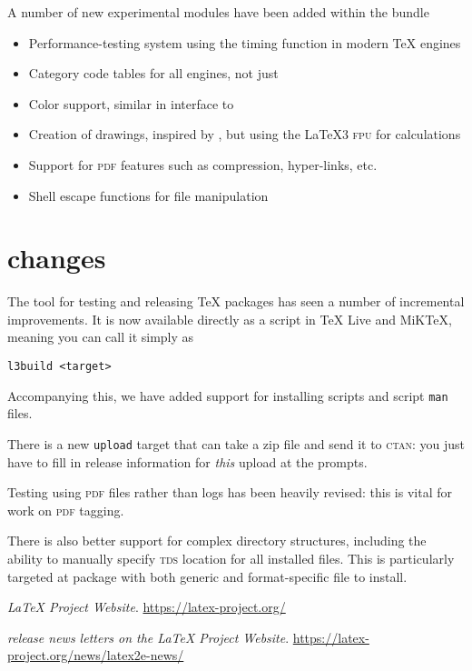 \documentclass{ltnews}
\begin{document}
A number of new experimental modules have been added within the
 bundle
\begin{itemize}
  \item {} Performance-testing system using the timing
    function in modern \TeX{} engines
  \item {} Category code tables for all engines, not
    just 
  \item {} Color support, similar in interface to 
  \item {} Creation of drawings, inspired by , but
    using the \LaTeX3 \textsc{fpu} for calculations
  \item {} Support for \textsc{pdf} features such as compression,
    hyper-links, etc.
  \item {} Shell escape functions for file manipulation
\end{itemize}

\section{ changes}

The  tool for testing and releasing \TeX{} packages
has seen a number of incremental improvements. It is now available directly
as a script in \TeX{} Live and MiK\TeX{}, meaning you can call it simply
as
\begin{verbatim}
l3build <target>
\end{verbatim}
Accompanying this, we have added support for installing scripts and script
\texttt{man} files.

There is a new \texttt{upload} target that can take a zip file and send it to
\textsc{ctan}: you just have to fill in release information for \emph{this}
upload at the prompts.

Testing using \textsc{pdf} files rather than logs has been heavily revised:
this is vital for work on \textsc{pdf} tagging.

There is also better support for complex directory structures, including the
ability to manually specify \textsc{tds} location for all installed files. This
is particularly targeted at package with both generic and format-specific file
to install.


\begin{thebibliography}{9}

\fontsize{9.3}{11.3}\selectfont


  \emph{\LaTeX{} Project Website}.
  \url{https://latex-project.org/}

  \emph{\LaTeXe{} release news letters on the \LaTeX{} Project Website}.
  \url{https://latex-project.org/news/latex2e-news/}

  
\end{thebibliography}
\end{document}
